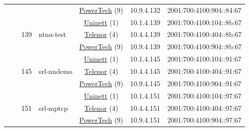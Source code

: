 \begin{small}
\begin{center}
\begin{longtable}{|c|c|c|c|c|c|c|c|}
  &  &  &  & \multicolumn{2}{|c|}{\tiny{\href{http://www.powertech.no}{PowerTech} (9)}} & \tiny{10.9.4.132} & \tiny{2001:700:4100:904::84:67} \\* \cline{3-3}\cline{4-4}\cline{5-5}\cline{6-6}\cline{7-7}\cline{8-8}
  &  & \multirow{3}{*}{\tiny{139}} & \multicolumn{1}{|l|}{\multirow{3}{*}{\tiny{ntnu-test}}} & \multicolumn{2}{|c|}{\tiny{\href{https://www.uninett.no}{Uninett} (1)}} & \tiny{10.1.4.139} & \tiny{2001:700:4100:104::8b:67} \\* \cline{5-5}\cline{6-6}\cline{7-7}\cline{8-8}
  &  &  &  & \multicolumn{2}{|c|}{\tiny{\href{https://www.telenor.no}{Telenor} (4)}} & \tiny{10.4.4.139} & \tiny{2001:700:4100:404::8b:67} \\* \cline{5-5}\cline{6-6}\cline{7-7}\cline{8-8}
  &  &  &  & \multicolumn{2}{|c|}{\tiny{\href{http://www.powertech.no}{PowerTech} (9)}} & \tiny{10.9.4.139} & \tiny{2001:700:4100:904::8b:67} \\* \cline{3-3}\cline{4-4}\cline{5-5}\cline{6-6}\cline{7-7}\cline{8-8}
  &  & \multirow{3}{*}{\tiny{145}} & \multicolumn{1}{|l|}{\multirow{3}{*}{\tiny{srl-nndemo}}} & \multicolumn{2}{|c|}{\tiny{\href{https://www.uninett.no}{Uninett} (1)}} & \tiny{10.1.4.145} & \tiny{2001:700:4100:104::91:67} \\* \cline{5-5}\cline{6-6}\cline{7-7}\cline{8-8}
  &  &  &  & \multicolumn{2}{|c|}{\tiny{\href{https://www.telenor.no}{Telenor} (4)}} & \tiny{10.4.4.145} & \tiny{2001:700:4100:404::91:67} \\* \cline{5-5}\cline{6-6}\cline{7-7}\cline{8-8}
  &  &  &  & \multicolumn{2}{|c|}{\tiny{\href{http://www.powertech.no}{PowerTech} (9)}} & \tiny{10.9.4.145} & \tiny{2001:700:4100:904::91:67} \\* \cline{3-3}\cline{4-4}\cline{5-5}\cline{6-6}\cline{7-7}\cline{8-8}
  &  & \multirow{3}{*}{\tiny{151}} & \multicolumn{1}{|l|}{\multirow{3}{*}{\tiny{srl-mptcp}}} & \multicolumn{2}{|c|}{\tiny{\href{https://www.uninett.no}{Uninett} (1)}} & \tiny{10.1.4.151} & \tiny{2001:700:4100:104::97:67} \\* \cline{5-5}\cline{6-6}\cline{7-7}\cline{8-8}
  &  &  &  & \multicolumn{2}{|c|}{\tiny{\href{https://www.telenor.no}{Telenor} (4)}} & \tiny{10.4.4.151} & \tiny{2001:700:4100:404::97:67} \\* \cline{5-5}\cline{6-6}\cline{7-7}\cline{8-8}
  &  &  &  & \multicolumn{2}{|c|}{\tiny{\href{http://www.powertech.no}{PowerTech} (9)}} & \tiny{10.9.4.151} & \tiny{2001:700:4100:904::97:67} \\* \cline{3-3}\cline{4-4}\cline{5-5}\cline{6-6}\cline{7-7}\cline{8-8}

\end{longtable}
\end{center}
\end{small}
